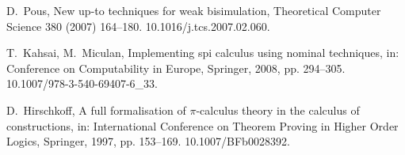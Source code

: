 \documentclass[GCNS]{yincog}
\theoremstyle{remark}
\theoremstyle{theorem}
\theoremstyle{remark}
\begin{document}
\begin{backmatter}
\begin{thebibliography}{}
\begin{bsubitem}
\begin{bcontribution}%
\end{bcontribution}
\begin{bhost}
\begin{bissue}
\end{bissue}
\end{bhost}
\end{bsubitem}
%
\OrigBibText
D.~Pous, New up-to techniques for weak bisimulation, Theoretical Computer
Science 380 (2007) 164--180. 10.1016/j.tcs.2007.02.060.
\endOrigBibText
{}%
\endbibitem

\begin{bsubitem}
\begin{bcontribution}%
\end{bcontribution}
\begin{bhost}
\begin{beditedbook}
\end{beditedbook}
\end{bhost}
\end{bsubitem}
%
\OrigBibText
T.~Kahsai, M.~Miculan, Implementing spi calculus using nominal techniques,
in: Conference on Computability in Europe, Springer, 2008, pp. 294--305.
10.1007/978-3-540-69407-6\_33.
\endOrigBibText
{}%
\endbibitem

\begin{bsubitem}
\begin{bcontribution}%
\end{bcontribution}
\begin{bhost}
\begin{beditedbook}
\end{beditedbook}
\end{bhost}
\end{bsubitem}
%
\OrigBibText
D.~Hirschkoff, A full formalisation of $\pi $-calculus theory in the calculus
of constructions, in: International Conference on Theorem Proving in Higher
Order Logics, Springer, 1997, pp. 153--169. 10.1007/BFb0028392.
\endOrigBibText
{}%
\endbibitem


\end{thebibliography}
\end{backmatter}
\end{document}
